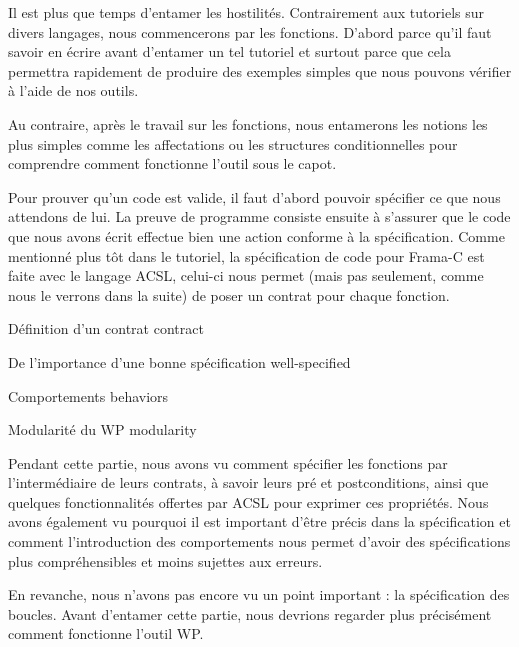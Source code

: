 
Il est plus que temps d'entamer les hostilités. Contrairement aux tutoriels 
sur divers langages, nous commencerons par les fonctions. D'abord parce 
qu'il faut savoir en écrire avant d'entamer un tel tutoriel et surtout 
parce que cela permettra rapidement de produire des exemples simples que
nous pouvons vérifier à l'aide de nos outils.



Au contraire, après le travail sur les fonctions, nous entamerons les notions 
les plus simples comme les affectations ou les structures conditionnelles pour 
comprendre comment fonctionne l'outil sous le capot.



Pour prouver qu'un code est valide, il faut d'abord pouvoir spécifier
ce que nous attendons de lui. La preuve de programme consiste ensuite à
s'assurer que le code que nous avons écrit effectue bien une action conforme à
la spécification. Comme mentionné plus tôt dans le tutoriel, la 
spécification de code pour Frama-C est faite avec le langage ACSL, celui-ci 
nous permet (mais pas seulement, comme nous le verrons dans la suite) de poser
un contrat pour chaque fonction.



\begin{levelTwo}
  {Définition d'un contrat}
  {contract}
\end{levelTwo}

\begin{levelTwo}
  {De l'importance d'une bonne spécification}
  {well-specified}
\end{levelTwo}

\begin{levelTwo}
  {Comportements}
  {behaviors}
\end{levelTwo}

\begin{levelTwo}
  {Modularité du WP}
  {modularity}
\end{levelTwo}

\horizontalLine
\newpage


Pendant cette partie, nous avons vu comment spécifier les fonctions par 
l'intermédiaire de leurs contrats, à savoir leurs pré et postconditions, ainsi
que quelques fonctionnalités offertes par ACSL pour exprimer ces propriétés. 
Nous avons également vu pourquoi il est important d'être précis dans la 
spécification et comment l'introduction des comportements nous permet d'avoir
des spécifications plus compréhensibles et moins sujettes aux erreurs.



En revanche, nous n'avons pas encore vu un point important : la spécification 
des boucles. Avant d'entamer cette partie, nous devrions regarder plus 
précisément comment fonctionne l'outil WP.
